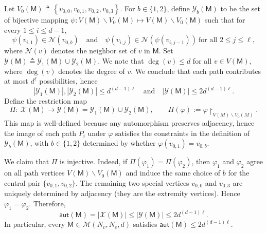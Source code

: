 \documentclass[letterpaper,11pt]{article}
\theoremstyle{definition}
\newcommand{\maN}{\mathcal{N}}
\newcommand{\sth}[1]{\left\{ #1 \right\}}
\newcommand{\sfM}{{\mathsf{M}}}
\newcommand{\aut}{\mathsf{aut}}
\begin{document}

Let $V_0(\sfM)\triangleq \sth{v_{0,0},v_{0,1},v_{0,2},v_{0,3}}$.
For $b\in\{1,2\}$, define $\mathcal{Y}_b(\sfM)$ to be the set of bijective mapping $\psi:V(\sfM)\backslash V_0(\sfM)\mapsto V(\sfM)\backslash V_0(\sfM)$  such that for every $1\le i\le d-1$,
\[
\psi(v_{i,1})\in \maN(v_{0,b})\quad\text{and}\quad \psi(v_{i,j})\in \maN(\psi(v_{i,j-1}))\ \text{for all }2\le j\le \ell,
\]
where $\maN(v)$ denotes the neighbor set of $v$ in $\sfM$. Set $\mathcal{Y}(\sfM)\triangleq \mathcal{Y}_1(\sfM)\cup\mathcal{Y}_2(\sfM)$.
We note that $\deg(v)\le d$ for all $v\in V(\sfM)$, where $\deg(v)$ denotes the degree of $v$.
We conclude that each path contributes at most $d^\ell$ possibilities, hence
\[
|\mathcal{Y}_1(\sfM)|, |\mathcal{Y}_2(\sfM)|\le d^{(d-1)\ell}\quad\text{and}\quad |\mathcal{Y}(\sfM)|\le 2d^{(d-1)\ell}.
\]
Define the restriction map
\[
\Pi:\ \mathcal{X}(\sfM)\longrightarrow \mathcal{Y}(\sfM)=\mathcal{Y}_1(\sfM)\cup\mathcal{Y}_2(\sfM),\qquad
\Pi(\varphi):=\varphi\!\restriction_{V(M)\backslash V_0(M)}.
\]
This map is well-defined because any automorphism preserves adjacency, hence the image
of each path $P_i$ under $\varphi$ satisfies the constraints in the definition of $\mathcal{Y}_b(\sfM)$,
with $b\in\{1,2\}$ determined by whether $\varphi(v_{0,1})=v_{0,b}$.

We claim that $\Pi$ is injective.
Indeed, if $\Pi(\varphi_1)=\Pi(\varphi_2)$, then $\varphi_1$ and $\varphi_2$ agree on all path
vertices $V(\sfM)\backslash V_0(\sfM)$ and induce the same choice of $b$ for the central pair
$\{v_{0,1},v_{0,2}\}$. The remaining two special vertices $v_{0,0}$ and $v_{0,3}$ are uniquely
determined by adjacency (they are the extremity vertices). Hence $\varphi_1=\varphi_2$.
Therefore,
\[
\aut(\sfM)=|\mathcal{X}(\sfM)|\le |\mathcal{Y}(\sfM)|\le 2d^{(d-1)\ell}.
\]
In particular, every $\sfM\in\mathcal{M}(N_v,N_e,d)$ satisfies
\(
\aut(\sfM)\le 2d^{(d-1)\ell}.
\)



\end{document}

